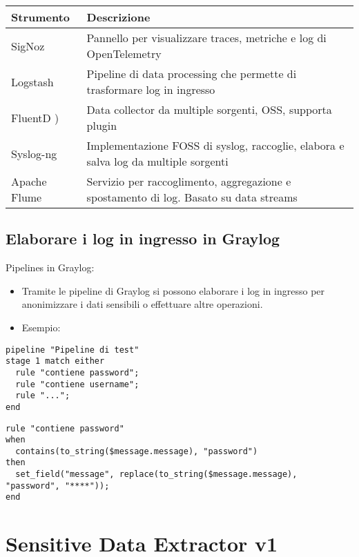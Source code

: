 \documentclass[12pt]{report}
\begin{document}
\begin{tabular}{|p{}|p{}|}
    \hline
    \textbf{Strumento} & \textbf{Descrizione}                                                                  \\ \hline
    SigNoz             & Pannello per visualizzare traces, metriche e log di OpenTelemetry                     \\ \hline
    Logstash           & Pipeline di data processing che permette di trasformare log in ingresso               \\ \hline
    FluentD )          & Data collector da multiple sorgenti, OSS, supporta plugin                             \\ \hline
    Syslog-ng          & Implementazione FOSS di syslog, raccoglie, elabora e salva log da multiple sorgenti   \\ \hline
    Apache Flume       & Servizio per raccoglimento, aggregazione e spostamento di log. Basato su data streams \\ \hline
\end{tabular}

\subsection*{Elaborare i log in ingresso in Graylog}

Pipelines in Graylog:

\begin{itemize}
    \item Tramite le pipeline di Graylog si possono elaborare i log in ingresso per anonimizzare i dati sensibili o effettuare altre operazioni.
    \item Esempio:
\end{itemize}

\begin{verbatim}
pipeline "Pipeline di test"
stage 1 match either
  rule "contiene password";
  rule "contiene username";
  rule "...";
end
\end{verbatim}

\begin{verbatim}
rule "contiene password"
when
  contains(to_string($message.message), "password")
then
  set_field("message", replace(to_string($message.message), "password", "****"));
end
\end{verbatim}



\section*{Sensitive Data Extractor v1}
\label{sec:sde_v1}
\end{document}
